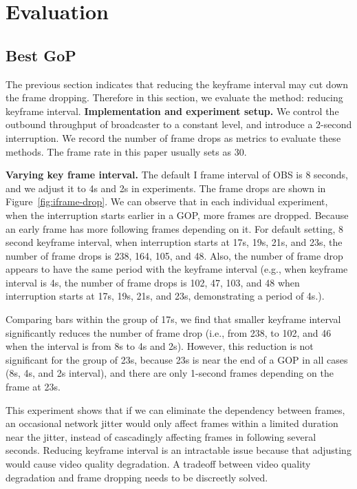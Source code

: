 \section{Evaluation}

\subsection{Best GoP}
The previous section indicates that reducing the keyframe interval may cut down the frame dropping. Therefore in this section, we evaluate the method: reducing keyframe interval.
\textbf{Implementation and experiment setup.}
We control the outbound throughput of broadcaster to a constant level, and introduce a 2-second interruption. We record the number of frame drops as metrics to evaluate these methods. The frame rate in this paper usually sets as 30.


\textbf{Varying key frame interval.} The default I frame interval of OBS is 8 seconds, and we adjust it to 4s and 2s in experiments. The frame drops are shown in Figure~\ref{fig:iframe-drop}. We can observe that in each individual experiment, when the interruption starts earlier in a GOP, more frames are dropped. Because an early frame has more following frames depending on it. For default setting, 8 second keyframe interval, when interruption starts at 17s, 19s, 21s, and 23s, the number of frame drops is 238, 164, 105, and 48.
Also, the number of frame drop appears to have the same period with the keyframe interval (e.g., when keyframe interval is 4s, the number of frame drops is 102, 47, 103, and 48 when interruption starts at 17s, 19s, 21s, and 23s, demonstrating a period of 4s.).

Comparing bars within the group of 17s, we find that smaller keyframe interval significantly reduces the number of frame drop (i.e., from 238, to 102, and 46 when the interval is from 8s to 4s and 2s). However, this reduction is not significant for the group of 23s, because 23s is near the end of a GOP in all cases (8s, 4s, and 2s interval), and there are only 1-second frames depending on the frame at 23s.

This experiment shows that if we can eliminate the dependency between frames, an occasional network jitter would only affect frames within a limited duration near the jitter, instead of cascadingly affecting frames in following several seconds. Reducing keyframe interval is an intractable issue because that adjusting would cause video quality degradation. A tradeoff between video quality degradation and frame dropping needs to be discreetly solved.

